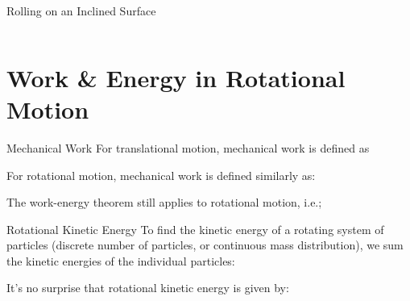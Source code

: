 \documentclass[12pt,compress,aspectratio=169]{beamer}
\begin{document}
\begin{frame}{Rolling on an Inclined Surface}
\begin{columns}


  \end{columns}
\end{frame}



\section{Work \& Energy in Rotational Motion}

\begin{frame}{Mechanical Work}
  For translational motion, mechanical work is defined as


  For rotational motion, mechanical work is defined similarly as:


  The work-energy theorem still applies to rotational motion, i.e.;

\end{frame}



\begin{frame}{Rotational Kinetic Energy}
  To find the kinetic energy of a rotating system of particles (discrete number
  of particles, or continuous mass distribution), we sum the
  kinetic energies of the individual particles:
    
  
  It's no surprise that rotational kinetic energy is given by:
  
\end{frame}
\end{document}
